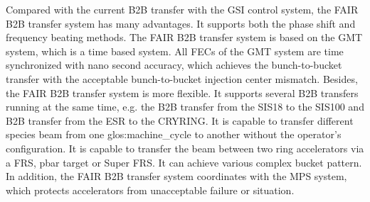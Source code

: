 Compared with the current B2B transfer with the GSI control system, the FAIR B2B transfer system has many advantages. It supports both the phase shift and frequency beating methods. 
The FAIR B2B transfer system is based on the GMT system, which is a time based system. All FECs of the GMT system are time synchronized with nano second accuracy, which achieves the bunch-to-bucket transfer with the acceptable bunch-to-bucket injection center mismatch. Besides, the FAIR B2B transfer system is more flexible. It supports several B2B transfers running at the same time, e.g. the B2B transfer from the SIS18 to the SIS100 and B2B transfer from the ESR to the CRYRING. It is capable to transfer different species beam from one \gls{glos:machine_cycle} to another without the operator's configuration. It is capable to transfer the beam between two ring accelerators via a \gls{FRS}, pbar target or Super FRS. It can achieve various complex bucket pattern. In addition, the FAIR B2B transfer system coordinates with the MPS system, which protects accelerators from unacceptable failure or situation. 


